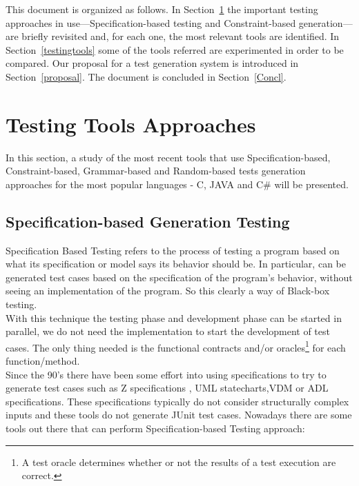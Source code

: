 This document is organized as follows.
In Section~\ref{testingapproaches} the important testing approaches in
use---Specification-based testing and Constraint-based generation---are briefly
revisited and, for each one,  the most relevant tools are identified.
In Section~\ref{testingtools} some of the tools referred are
experimented in order to be compared.
Our proposal for a test generation system is introduced in
Section~\ref{proposal}.
The document is concluded in Section~\ref{Concl}.

\section{Testing Tools Approaches}\label{testingapproaches}
In this section, a study of the most recent tools that use Specification-based, Constraint-based, Grammar-based and Random-based tests generation
approaches for the most popular languages - C, JAVA and C\# will be presented.

\subsection{Specification-based Generation Testing}
Specification Based Testing refers to the process of testing a program based on what its specification or model says its behavior should be.
In particular, can be generated test cases based on the specification of the program's behavior, without seeing an implementation of the program. So this clearly a
way of Black-box testing.\\
With this technique the testing phase and development phase can be started in parallel, we do not need the implementation
to start the development of test cases. The only thing needed is the functional contracts and/or oracles\footnote{A test oracle determines whether or not the results of a test execution are correct\cite{Peters95generatinga}.} for each function/method.\\
Since the 90's there have been some effort into using specifications to try to generate test cases such as Z specifications
\cite{Horcher95improvingsoftware,Stocks:1996:FST:239916.239918}, UML statecharts\cite{Offutt:1999:GTU:1767297.1767341},VDM\cite{Aichernig99automatedblack-box}
or ADL specifications\cite{Sankar94specifyingand}.
These specifications typically do not consider structurally complex inputs and these tools do not generate JUnit test cases.
Nowadays there are some tools out there that can perform Specification-based Testing approach:

